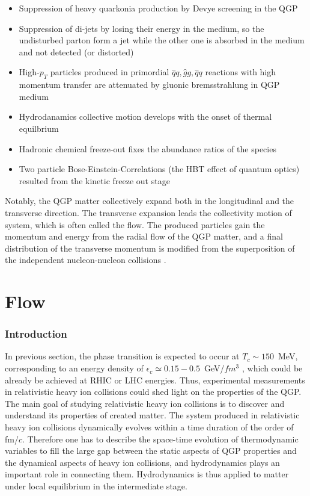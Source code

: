 	\begin{itemize}
		\item Suppression of heavy quarkonia production by Devye screening in the QGP
		\item Suppression of di-jets by losing their energy in the medium, so the undisturbed parton form a jet while the other one is absorbed in the medium and not detected (or distorted)
		\item High-$p_T$ particles produced in primordial $\hat{q}q, \hat{g}g, \hat{q}q$ reactions with high momentum transfer are attenuated by gluonic bremsstrahlung in QGP medium
		\item Hydrodanamics collective motion develops with the onset of thermal equilbrium
		\item Hadronic chemical freeze-out fixes the abundance ratios of the species
		\item Two particle Bose-Einstein-Correlations (the HBT effect of quantum optics) resulted from the kinetic freeze out stage
	\end{itemize}


 	Notably, the QGP matter collectively expand both in the longitudinal and the transverse direction. The transverse expansion leads the collectivity motion of system, which is often called the flow. The produced particles gain the momentum and energy from the radial flow of the QGP matter, and a final distribution of the transverse momentum is modified from the superposition of the independent nucleon-nucleon collisions \cite{Shen:2011eg}.
 	


\section{Flow}
\label{sec:flow}
\subsubsection{Introduction}
  In previous section, the phase transition is expected to occur at $T_c \sim 150$~MeV, corresponding to an energy density of $\epsilon_c \simeq 0.15 - 0.5$~GeV/$fm^3$ \cite{Bazavov:2014pvz}, which could be already be achieved at RHIC or LHC energies. Thus, experimental measurements in relativistic heavy ion collisions could shed light on the properties of the QGP. The main goal of studying relativistic heavy ion collisions is to discover and understand its properties of created matter. The system produced in relativistic heavy ion collisions dynamically evolves within a time duration of the order of fm/$c$. Therefore one has to describe the space-time evolution of thermodynamic variables to fill the large gap between the static aspects of QGP properties and the dynamical aspects of heavy ion collisions, and hydrodynamics plays an important role in connecting them. Hydrodynamics is thus applied to matter under local equilibrium in the intermediate stage.

